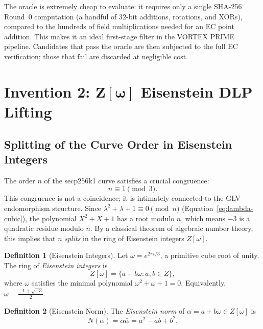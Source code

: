 \documentclass[11pt,a4paper]{article}
\theoremstyle{definition}
\newtheorem{definition}{Definition}[section]
\begin{document}
The oracle is extremely cheap to evaluate: it requires only a single SHA-256 Round~0 computation (a handful of 32-bit additions, rotations, and XORs), compared to the hundreds of field multiplications needed for an EC point addition. This makes it an ideal first-stage filter in the VORTEX PRIME pipeline. Candidates that pass the oracle are then subjected to the full EC verification; those that fail are discarded at negligible cost.

\section{Invention 2: $\mathbf{Z[\omega]}$ Eisenstein DLP Lifting}

\subsection{Splitting of the Curve Order in Eisenstein Integers}

The order $n$ of the secp256k1 curve satisfies a crucial congruence:
\begin{equation}
  n \equiv 1 \pmod{3}.
  \label{eq:n-mod-3}
\end{equation}
This congruence is not a coincidence; it is intimately connected to the GLV endomorphism structure. Since $\lambda^2 + \lambda + 1 \equiv 0 \pmod{n}$ (Equation~\ref{eq:lambda-cubic}), the polynomial $X^2 + X + 1$ has a root modulo $n$, which means $-3$ is a quadratic residue modulo $n$. By a classical theorem of algebraic number theory, this implies that $n$ \emph{splits} in the ring of Eisenstein integers $Z[\omega]$.

\begin{definition}[Eisenstein Integers]
  Let $\omega = e^{2\pi i/3}$, a primitive cube root of unity. The ring of \emph{Eisenstein integers} is
  \begin{equation}
    Z[\omega] = \{a + b\omega : a, b \in Z\},
  \end{equation}
  where $\omega$ satisfies the minimal polynomial $\omega^2 + \omega + 1 = 0$. Equivalently, $\omega = \frac{-1 + \sqrt{-3}}{2}$.
\end{definition}

\begin{definition}[Eisenstein Norm]
  The \emph{Eisenstein norm} of $\alpha = a + b\omega \in Z[\omega]$ is
  \begin{equation}
    N(\alpha) = \alpha \bar{\alpha} = a^2 - ab + b^2.
    \label{eq:eisenstein-norm}
  \end{equation}
\end{definition}
\end{document}
